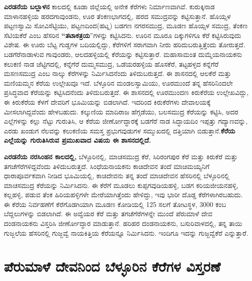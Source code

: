 \textbf{ಎರಡನೆಯ ಬಲ್ಲಾಳನ} ಕಾಲದಲ್ಲಿ ಕೂಡಾ ಜಿಲ್ಲೆಯಲ್ಲಿ ಅನೇಕ ಕೆರೆಗಳು ನಿರ್ಮಾಣವಾಗಿವೆ. ಕುರುಕ್ಕಿನಾಡ ಮಾಳಾನಹಳ್ಳಿಯ ಹರದಗಾವುಂಡನು, ಊರ ತೆಂಕಣಭಾಗದಲ್ಲಿ, ಹರದ ಸಮುದ್ರವನ್ನು ಕಟ್ಟಿಸುತ್ತಾನೆ. ಹೊಯ್ಸಳ ಪಟ್ಟಣಸ್ವಾಮಿ ಸೋವಿಸೆಟ್ಟಿಯು, ಪಟ್ಟಣದಿಂದ(ಹಟ್ನ) ಬಡಗಣ ನಗರಸಮುದ್ರ, ಮೂಡಣ ಹೊಯ್ಸಳ ಸಮುದ್ರ, ತೆಂಕಣ ಸೆಟಿಯಕೆರೆ ಎಂಬ ಹೆಸರಿನ \textbf{“ತಟಾಕತ್ರಯ}”ಗಳನ್ನು ಕಟ್ಟಿಸಿದನು. ಊರಿನ ಮೂರೂ ದಿಕ್ಕುಗಳಿಗೂ ಕೆರೆ ಕಟ್ಟಿಸಿರುವುದು ವಿಶೇಷ. ಈ ಊರು ಬೆಟ್ಟ ಗುಡ್ಡಗಳ ಬದಿಯಲ್ಲಿದ್ದು, ಕೆರೆಗಳಿಗೆ ಸರಾಗವಾಗಿ ನೀರು ಹರಿದುಬರುತ್ತಿತ್ತೆಂದು ತೋರುತ್ತದೆ. ಬಡಗೆರೆನಾಡಾಳುವ ಗಾವುಂಡರು, ಆಲದಹಳ್ಳಿಯಲ್ಲಿ ಕೆರೆಯನ್ನು ಕಟ್ಟಿಸುತ್ತಾರೆ. ಮಹಾಸಾಮಂತ ದುಮ್ಮೆಯನಾಯಕನು ಕಲುಕಣಿ ನಾಡ ಜೆಟ್ಟಿಗದಲ್ಲಿ, ಕನ್ನೆಗೆರೆ ದುಮ್ಮಸಮುದ್ರ, ಒಡೆಯರಹಳ್ಳಿಯ ಹೊಸಕೆರೆ, ತಟ್ಟಹಳ್ಳದ ಕನ್ನೆಗೆರೆ ಮಸಣಸಮುದ್ರ ಎಂಬ ನಾಲ್ಕು ಕೆರೆಗಳನ್ನು ನಿರ್ಮಿಸಿದನೆಂದು ತಿಳಿದುಬರುತ್ತದೆ. ಈ ಶಾಸನದಲ್ಲಿ ಆಲಕೆರೆ ಮತ್ತು ಮಣಿಯಮ್ಮನ ಕೆರೆಯ ಉಲ್ಲೇಖವೂ ಇದೆ. ಬೆಳ್ಳೂರಿನ ಮಂಡಲಸ್ವಾಮಿಯು, ಊರಮುಂದೆ ತನ್ನ ಹೆಸರಿನಿಂದಲೇ ಪ್ರಸಿದ್ಧವಾದ ಕೆರೆಯನ್ನು ಕಟ್ಟಿಸಿದನೆಂದು ತಿಳಿದುಬರುತ್ತದೆ. ಈ ಶಾಸನದಲ್ಲಿ ಊರಮುಂದಣ ಕಿರುಕೆರೆಯ ಉಲ್ಲೇಖವಿದ್ದು, ಈ ಕಿರುಕೆರೆಯ ಕೆಳಗೆ ದೇವರಿಗೆ ಭೂಮಿಯನ್ನು ಬಿಡಲಾಗಿದೆ. ಇದರಿಂದ ಕಿರುಕೆರೆಗಳು ದೇವಾಲಯಕ್ಕೆ ಮೀಸಲಾಗಿದ್ದವೆಂದು ಹೇಳಬಹುದು. ಕಲ್ಕುಣಿಯ ಮಾದಿರಾಜ ಹೆಗ್ಗಡೆಯು, ಬಲಸಮುದ್ರ ಕೆರೆಯನ್ನು ಕಟ್ಟಿಸಿ, ಅದರ ಎಲ್ಲೆಗಳನ್ನು ಕಲ್ಲು ನೆಟ್ಟು ಗುರುತಿಸಿ, ಆ ಕೆರೆಯ ಜೀರ್ಣೋದ್ಧಾರಕ್ಕೆ ಬಡಗೆರೆ ನಾಡ ಸಿದ್ಧಾಯದಿಂ ಇಪ್ಪತ್ತು ಗದ್ಯಾಣವನ್ನು, ಎರಡು ಖಂಡುಗ ನೆಲವನ್ನು ಕಲುಕಣಿಯ ಸಮಸ್ತ ಪ್ರಭುಗವುಡುಗಳ ಸಮ್ಮುಖದಲ್ಲಿ ದತ್ತಿಯಾಗಿ ಬಿಡುತ್ತಾನೆ.\textbf{ಕೆರೆಯ ಎಲ್ಲೆಯನ್ನು ಗುರುತಿಸಿರುವ ಪ್ರಮುಖವಾದ ವಿಷಯ ಈ ಶಾಸನದಲ್ಲಿದೆ.}

\textbf{ಎರಡನೆಯ ನರಸಿಂಹನ ಕಾಲದಲ್ಲಿ,} ಬೆಳ್ಳೂರಿನಲ್ಲಿ, ಮಾಚಸಮುದ್ರ ಕೆರೆ, ಸಿರಿರಂಗಪುರ ಕೆರೆ ಮತ್ತು ಕಿರುಕೆರೆ ಮತ್ತು ತಗಚೆಗೆರೆಗಳಿದ್ದವೆಂದು ತಿಳಿದುಬರುತ್ತದೆ. ಸಿಂಧೆಯನಾಯಕನು ಕಾಚಿದೇವನ ತಂದೆ ಮಾಚಿಮಯ್ಯನಿಗೆ ಧಾರಾಪೂರ್ವಕವಾಗಿ ನೀಡಿದ ಭೂಮಿಯಲ್ಲಿ, ಕಾಚಿದೇವನು ತನ್ನ ತಂದೆ ಮಾಚಿದೇವನ ಹೆಸರಿನಲ್ಲಿ ಬೆಳ್ಳೂರಿನಲ್ಲಿ ಮಾಚಸಮುದ್ರ ಕೆರೆಯನ್ನು ನಿರ್ಮಿಸಿದನು. ಈ ಕೆರೆಗೆ ಮೂಡಲು ಕುಪ್ಪಗವುಡಿಯಹಳ್ಳಿ, ಬಡಗ ಕರಿಯಜೀಯನಹಳ್ಳಿ, ಕಲ್ಲಹಳ್ಳಿ, ಪಡುವ ತೆಂಕ ಹಿರಿಯಹಳ್ಳಿಗಳೇ ಮೇರೆಯಾಗಿತ್ತೆಂದು ಹೇಳಿದ್ದು, ಇವು ಭಾರೀ ದೊಡ್ಡ ಕೆರೆಗಳಾಗಿರಬಹುದು. ಈ ಕೆರೆಯ ನಿರ್ವಹಣೆಗೆ ಕೆರೆಗೊಡಗಿಯಾಗಿ ಮೂಡಣ ಕೋಡಿಯಲ್ಲಿ 125 ಸಲಗೆ ತೋಟಸ್ಥಳ, 3000 ಕಂಬ ಬೆದ್ದಲುಗಳನ್ನು ಬಿಡಲಾಗಿದೆ. ಈ ಅವ್ವೆಯರ ಕೆರೆ ಮತ್ತು ತಗಚೆಗೆರೆಗಳನ್ನೇ ಮುಂದೆ ಪೆರುಮಾಳೆ ದೇವ ದಂಡನಾಯಕನು ವಿಸ್ತರಿಸಿ ಜೀರ್ಣೋದ್ಧಾರ ಮಾಡುತ್ತಾನೆ. ಹರಿಹರ ದಂಡನಾಯಕನು, ಬಸುರಿವಾಳದಲ್ಲಿ, ತನ್ನ ತಾಯಿ ಗುಜ್ಜಲೆಯ ಹೆಸರಿನಲ್ಲಿ ಗುಜ್ಜವ್ವೆ ನಾಯಕಿತ್ತಿಯ ಕೆರೆಯನ್ನೂ ನಿರ್ಮಿಸಿದನು. ಇಂದಿಗೂ ಇದನ್ನು ಗುಜ್ಜವ್ವೆಕೆರೆ ಎನ್ನುತ್ತಾರೆ.


\section{ಪೆರುಮಾಳೆ ದೇವನಿಂದ ಬೆಳ್ಳೂರಿನ ಕೆರೆಗಳ ವಿಸ್ತರಣೆ}

